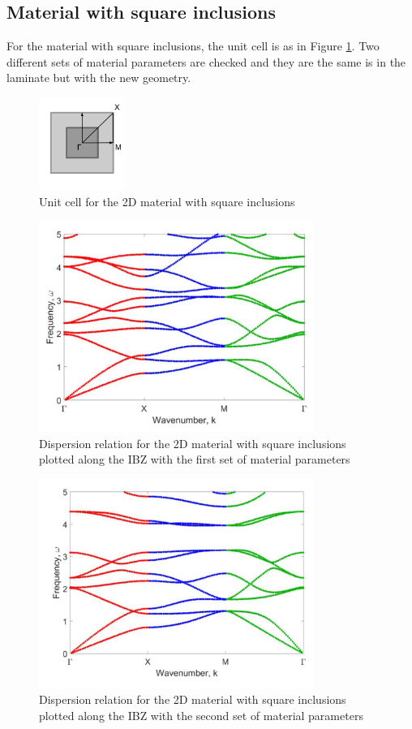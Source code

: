 \documentclass{article}
\begin{document}
\subsection{Material with square inclusions}
For the material with square inclusions, the unit cell is as in Figure 
\ref{fig:twodrescell}. Two different sets of material parameters are checked 
and they are the same is in the laminate but with the new geometry.
\begin{figure}[!htbp]
	\centering
	\includegraphics[width=0.25\textwidth]{twodrescell.pdf}
	\caption{Unit cell for the 2D material with square inclusions}
	\label{fig:twodrescell}
\end{figure}
\begin{figure}[!htbp]
	\centering
	\includegraphics[width=0.8\textwidth]{twodres16.pdf}
	\caption{Dispersion relation for the 2D material with 
		square inclusions plotted along the IBZ with the first set of material 
		parameters}
	\label{fig:twodres16}
\end{figure}
\begin{figure}[!htbp]
	\centering
	\includegraphics[width=0.8\textwidth]{twodres.pdf}
	\caption{Dispersion relation for the 2D material with 
	square inclusions plotted along the IBZ with the second set of material 
	parameters}
	\label{fig:twodres}
\end{figure}
\end{document}
